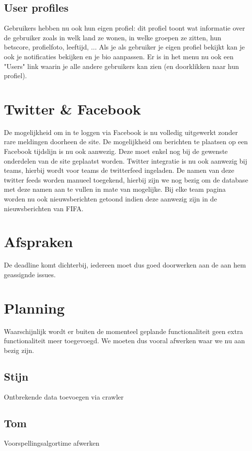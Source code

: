 \documentclass[11pt, a4paper]{article}
\begin{document}
\subsection{User profiles}
Gebruikers hebben nu ook hun eigen profiel: dit profiel toont wat informatie over de gebruiker zoals in welk land ze wonen, in welke groepen ze zitten, hun betscore, profielfoto, leeftijd, ...
Als je als gebruiker je eigen profiel bekijkt kan je ook je notificaties bekijken en je bio aanpassen.
Er is in het menu nu ook een "Users" link waarin je alle andere gebruikers kan zien (en doorklikken naar hun profiel).

\section{Twitter & Facebook}
De mogelijkheid om in te loggen via Facebook is nu volledig uitgewerkt zonder rare meldingen doorheen de site. De mogelijkheid om berichten te plaatsen op een Facebook tijdslijn is nu ook aanwezig. Deze moet enkel nog bij de gewenste onderdelen van de site geplaatst worden. Twitter integratie is nu ook aanwezig bij teams, hierbij wordt voor teams de twitterfeed ingeladen. De namen van deze twitter feeds worden manueel toegekend, hierbij zijn we nog bezig om de database met deze namen aan te vullen in mate van mogelijke. Bij elke team pagina worden nu ook nieuwsberichten getoond indien deze aanwezig zijn in de nieuwsberichten van FIFA.

\section{Afspraken}
De deadline komt dichterbij, iedereen moet dus goed doorwerken aan de aan hem geassignde issues.


\section{Planning}
Waarschijnlijk wordt er buiten de momenteel geplande functionaliteit geen extra functionaliteit meer toegevoegd. We moeten dus vooral afwerken waar we nu aan bezig zijn.
\subsection{Stijn}
Ontbrekende data toevoegen via crawler
\subsection{Tom}
Voorspellingsalgortime afwerken
\end{document}
